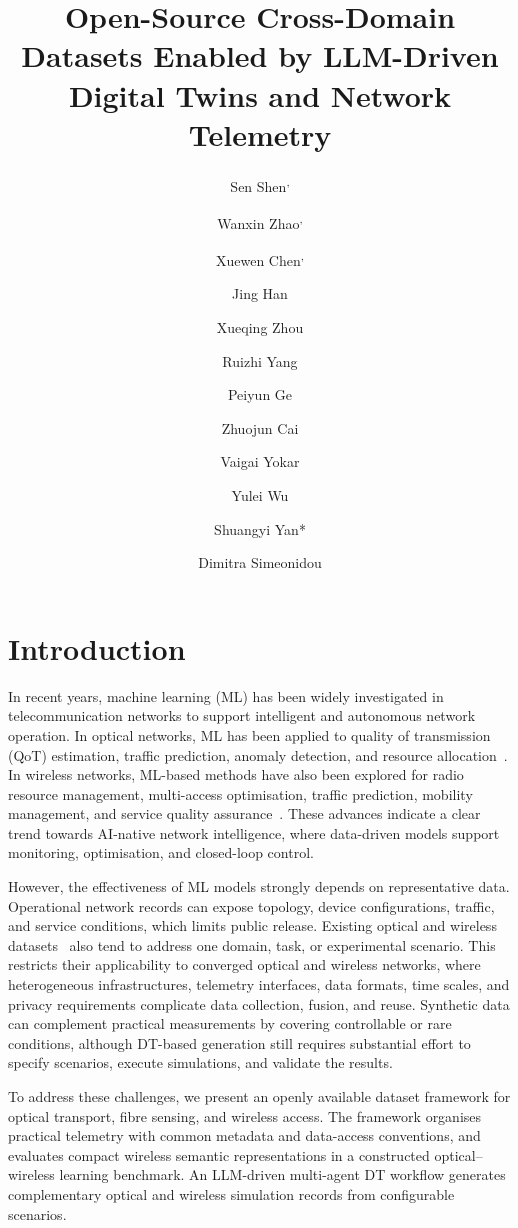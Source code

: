 \documentclass[9pt,twocolumn,twoside]{osajnl}
\title{{Open-Source Cross-Domain Datasets Enabled by LLM-Driven Digital Twins and Network Telemetry}}
\author[1]{Sen Shen\textsuperscript{\textdagger,}}
\author[1]{Wanxin Zhao\textsuperscript{\textdagger,}}
\author[1]{Xuewen Chen\textsuperscript{\textdagger,}}
\author[1]{Jing Han}
\author[1]{Xueqing Zhou}
\author[1]{Ruizhi Yang}
\author[1]{Peiyun Ge}
\author[1]{Zhuojun Cai}
\author[1]{Vaigai Yokar}
\author[1]{Yulei Wu}
\author[1]{Shuangyi Yan*}
\author[1]{Dimitra Simeonidou}
\affil[1]{Smart Internet Lab, Faculty of Science and Engineering, University of Bristol, Bristol, United Kingdom.\newline
\textsuperscript{$\dagger$}These authors contributed equally to this work.}
\affil[*]{shuangyi.yan@bristol.ac.uk}
\begin{document}
\maketitle

\section{Introduction}

In recent years, machine learning (ML) has been widely investigated in telecommunication networks to support intelligent and autonomous network operation. In optical networks, ML has been applied to quality of transmission (QoT) estimation, traffic prediction, anomaly detection, and resource allocation~\cite{villa2023IEEEAccess}. In wireless networks, ML-based methods have also been explored for radio resource management, multi-access optimisation, traffic prediction, mobility management, and service quality assurance~\cite{sun2019IEEE}. These advances indicate a clear trend towards AI-native network intelligence, where data-driven models support monitoring, optimisation, and closed-loop control.

However, the effectiveness of ML models strongly depends on representative data. Operational network records can expose topology, device configurations, traffic, and service conditions, which limits public release. Existing optical and wireless datasets~\cite{zhai2024alibaba,filer2016microsoft} also tend to address one domain, task, or experimental scenario. This restricts their applicability to converged optical and wireless networks, where heterogeneous infrastructures, telemetry interfaces, data formats, time scales, and privacy requirements complicate data collection, fusion, and reuse. Synthetic data can complement practical measurements by covering controllable or rare conditions, although DT-based generation still requires substantial effort to specify scenarios, execute simulations, and validate the results.

To address these challenges, we present an openly available dataset framework for optical transport, fibre sensing, and wireless access. The framework organises practical telemetry with common metadata and data-access conventions, and evaluates compact wireless semantic representations in a constructed optical--wireless learning benchmark. An LLM-driven multi-agent DT workflow generates complementary optical and wireless simulation records from configurable scenarios.
\end{document}
